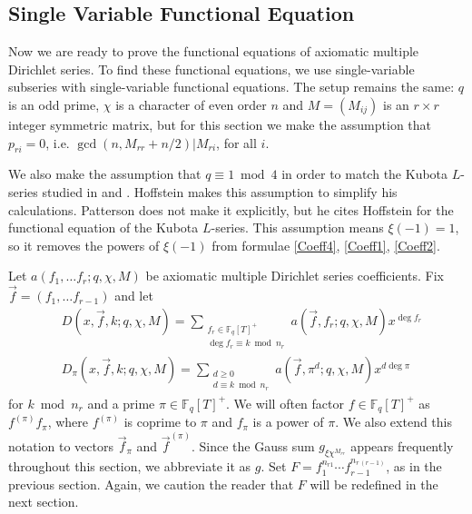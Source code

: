 \documentclass[11pt,letterpaper]{article}
\theoremstyle{definition}
\theoremstyle{remark}
\numberwithin{equation}{section}
\theoremstyle{dotless}
\newcommand{\F}{\mathbb{F}}
\begin{document}
\subsection{Single Variable Functional Equation}

Now we are ready to prove the functional equations of axiomatic multiple Dirichlet series. To find these functional equations, we use single-variable subseries with single-variable functional equations. The setup remains the same: $q$ is an odd prime, $\chi$ is a character of even order $n$ and $M=(M_{ij})$ is an $r \times r$ integer symmetric matrix, but for this section we make the assumption that $p_{ri}=0$, i.e. $\gcd(n, M_{rr}+n/2) | M_{ri}$, for all $i$. 

We also make the assumption that $q\equiv 1 \bmod 4$ in order to match the Kubota $L$-series studied in \cite{Hoffstein} and \cite{Patterson}. Hoffstein makes this assumption to simplify his calculations. Patterson does not make it explicitly, but he cites Hoffstein for the functional equation of the Kubota $L$-series. This assumption means $\xi(-1)=1$, so it removes the powers of $\xi(-1)$ from formulae \eqref{Coeff4}, \eqref{Coeff1}, \eqref{Coeff2}. 

Let $a(f_1, \ldots f_r; q, \chi, M)$ be axiomatic multiple Dirichlet series coefficients. Fix $\vec{f}=(f_1, \ldots f_{r-1})$ and let
\begin{align}
&D(x, \vec{f}, k; q, \chi, M) = \sum_{\substack{f_r \in \F_q[T]^+ \\ \deg f_r \equiv k \bmod n_r}} a(\vec{f}, f_r; q, \chi, M) x^{\deg f_r} \\
&D_\pi(x, \vec{f}, k; q, \chi, M) = \sum_{\substack{d\geq 0 \\ d \equiv k \bmod n_r}} a(\vec{f}, \pi^d; q, \chi, M) x^{d \deg \pi}
\end{align}
for $k \bmod n_r$ and a prime $\pi \in \F_q[T]^+$. We will often factor $f\in \F_q[T]^+$ as $f^{(\pi)} f_\pi$, where $f^{(\pi)}$ is coprime to $\pi$ and $f_\pi$ is a power of $\pi$. We also extend this notation to vectors $\vec{f}_\pi$ and $\vec{f}^{(\pi)}$. Since the Gauss sum $g_{\xi \chi^{M_{rr}}}$ appears frequently throughout this section, we abbreviate it as $g$. Set $F=f_1^{n_{r1}}\cdots f_{r-1}^{n_{r \, (r-1)}}$, as in the previous section. Again, we caution the reader that $F$ will be redefined in the next section.
\end{document}
